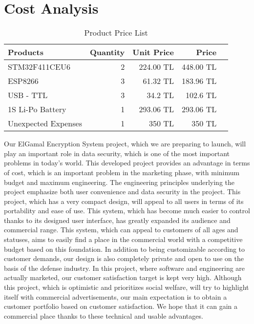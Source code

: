 \documentclass[12pt]{article}
\begin{document}
 	\section{Cost Analysis}
 	\begin{table}[h!]
 		\centering
 		\begin{tabular}{|l|r|r|r|r|}
 			\hline
 			\textbf{Products} & \textbf{Quantity} & \textbf{Unit Price} & \textbf{Price} \\
 			\hline
 			STM32F411CEU6 & 2 & 224.00 TL & 448.00 TL \\ \hline
 			ESP8266       & 3 & 61.32 TL & 183.96 TL \\ \hline
 			USB - TTL     & 3 & 34.2 TL & 102.6 TL \\ \hline 
 			1S Li-Po Battery & 1 & 293.06 TL & 293.06 TL \\ \hline
 			Unexpected Expenses & 1 & 350 TL & 350 TL \\ 
 			\hline
 		\end{tabular}
 		\caption{Product Price List}
 	\end{table}
 	Our ElGamal Encryption System project, which we are preparing to launch, will play an important role in data security, which is one of the most important problems in today's world.
 	This developed project provides an advantage in terms of cost, which is an important problem in the marketing phase, with minimum budget and maximum engineering. The engineering principles underlying the project emphasize both user convenience and data security in the project.
 	This project, which has a very compact design, will appeal to all users in terms of its portability and ease of use.
 	This system, which has become much easier to control thanks to its designed user interface, has greatly expanded its audience and commercial range.
 	This system, which can appeal to customers of all ages and statuses, aims to easily find a place in the commercial world with a competitive budget based on this foundation.
 	In addition to being customizable according to customer demands, our design is also completely private and open to use on the basis of the defense industry. In this project, where software and engineering are actually marketed, our customer satisfaction target is kept very high.
 	Although this project, which is optimistic and prioritizes social welfare, will try to highlight itself with commercial advertisements, our main expectation is to obtain a customer portfolio based on customer satisfaction.
 	We hope that it can gain a commercial place thanks to these technical and usable advantages.
 	
\end{document}

